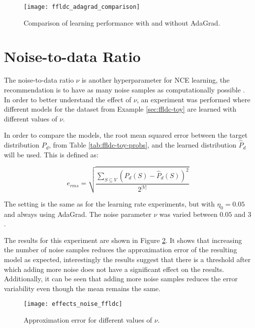 \begin{figure}
  \centering
  \texttt{[image: ffldc\_adagrad\_comparison]}
  \caption{Comparison of learning performance with and without AdaGrad.}
  \label{fig:comparison_adagrad_ffldc_toy}
\end{figure}

\section{Noise-to-data Ratio}

The noise-to-data ratio $\nu$ is another hyperparameter for NCE learning, the recommendation is to have as many noise samples as computationally possible \citep{Gutmann12NCE}. In order to better understand the effect of $\nu$, an experiment was performed where different models for the dataset from Example \ref{sec:ffldc-toy} are learned with different values of $\nu$.

In order to compare the models, the root mean squared error between the target distribution $P_{d}$, from Table \ref{tab:ffldc-toy-probs}, and the learned distribution $\hat{P}_{d}$ will be used. This is defined as:

\begin{equation}
  \label{eq:rmse}
  e_{rms} = \sqrt{\frac{\sum_{S \subseteq V}\left(P_{d}(S) - \hat{P}_{d}(S)\right)^{2}}{2^{|V|}}}
\end{equation}

The setting is the same as for the learning rate experiments, but with $\eta_{0} = 0.05$ and always using AdaGrad. The noise parameter $\nu$ was varied between $0.05$ and $3$.

The results for this experiment are shown in Figure \ref{fig:effects_noise_ffldc}. It shows that increasing the number of noise samples reduces the approximation error of the resulting model as expected, interestingly the results suggest that there is a threshold after which adding more noise does not have a significant effect on the results. Additionally, it can be seen that adding more noise samples reduces the error variability even though the mean remains the same.

\begin{figure}
  \centering
  \texttt{[image: effects\_noise\_ffldc]}
  \caption{Approximation error for different values of $\nu$.}
  \label{fig:effects_noise_ffldc}
\end{figure}

